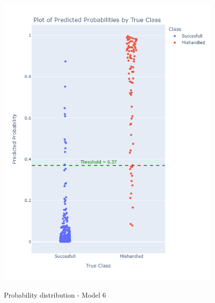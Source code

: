 \documentclass[12pt]{article}
\begin{document}
\begin{figure}
\begin{minipage}[c]{0.4\linewidth}
    \includegraphics[width=1\textwidth]{Probability_distribution_Model 6.png}\\
    \caption{Probability distribution - Model 6}
\end{minipage}%
\end{figure}
\end{document}
